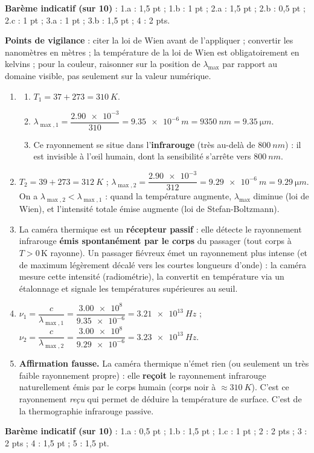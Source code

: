 \documentclass[11pt]{article}
\newcommand{\cle}[1]{{\popxbold\color{popdark}#1}}
\begin{document}
\begin{corrige}
\medskip
\textbf{Barème indicatif (sur 10)} : 1.a : 1,5 pt ; 1.b : 1 pt ; 2.a : 1,5 pt ; 2.b : 0,5 pt ; 2.c : 1 pt ; 3.a : 1 pt ; 3.b : 1,5 pt ; 4 : 2 pts.

\textbf{Points de vigilance} : citer la loi de Wien avant de l'appliquer ; convertir les nanomètres en mètres ; la température de la loi de Wien est obligatoirement en kelvins ; pour la couleur, raisonner sur la position de $\lambda_{\max}$ par rapport au domaine visible, pas seulement sur la valeur numérique.
\end{corrige}

\begin{corrige}
\begin{enumerate}
\item 
\begin{enumerate}
\item $T_1 = 37 + 273 = \SI{310}{K}$.
\item $\lambda_{\max,1} = \dfrac{\num{2,90e-3}}{310} = \SI{9,35e-6}{m} = \SI{9350}{nm} = \SI{9,35}{\micro m}$.
\item Ce rayonnement se situe dans l'\textbf{infrarouge} (très au-delà de $\SI{800}{nm}$) : il est invisible à l'œil humain, dont la sensibilité s'arrête vers $\SI{800}{nm}$.
\end{enumerate}
\item $T_2 = 39 + 273 = \SI{312}{K}$ ; $\lambda_{\max,2} = \dfrac{\num{2,90e-3}}{312} = \SI{9,29e-6}{m} = \SI{9,29}{\micro m}$. On a $\lambda_{\max,2} < \lambda_{\max,1}$ : quand la température augmente, $\lambda_{\max}$ diminue (loi de Wien), et l'intensité totale émise augmente (loi de Stefan-Boltzmann).
\item La caméra thermique est un \textbf{récepteur passif} : elle détecte le rayonnement infrarouge \textbf{émis spontanément par le corps} du passager (tout corps à $T > 0\,\text{K}$ rayonne). Un passager fiévreux émet un rayonnement plus intense (et de maximum légèrement décalé vers les courtes longueurs d'onde) : la caméra mesure cette intensité (radiométrie), la convertit en température via un étalonnage et signale les températures supérieures au seuil.
\item $\nu_1 = \dfrac{c}{\lambda_{\max,1}} = \dfrac{\num{3,00e8}}{\num{9,35e-6}} = \SI{3,21e13}{Hz}$ ; $\nu_2 = \dfrac{c}{\lambda_{\max,2}} = \dfrac{\num{3,00e8}}{\num{9,29e-6}} = \SI{3,23e13}{Hz}$.
\item \textbf{Affirmation fausse.} La caméra thermique n'émet rien (ou seulement un très faible rayonnement propre) : elle \textbf{reçoit} le rayonnement infrarouge naturellement émis par le corps humain (corps noir à $\approx \SI{310}{K}$). C'est ce rayonnement \emph{reçu} qui permet de déduire la température de surface. C'est de la \cle{thermographie infrarouge passive}.
\end{enumerate}
\textbf{Barème indicatif (sur 10)} : 1.a : 0,5 pt ; 1.b : 1,5 pt ; 1.c : 1 pt ; 2 : 2 pts ; 3 : 2 pts ; 4 : 1,5 pt ; 5 : 1,5 pt.


\end{corrige}
\end{document}
